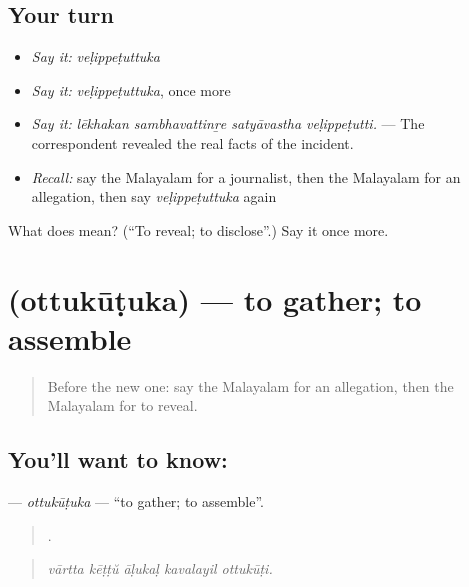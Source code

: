 \subsection*{Your turn}
\begin{itemize}
\raggedright
  \item \emph{Say it:} \emph{veḷippeṭuttuka}
  \item \emph{Say it:} \emph{veḷippeṭuttuka}, once more
  \item \emph{Say it:} \emph{lēkhakan sambhavattinṟe satyāvastha veḷippeṭutti.} — The correspondent revealed the real facts of the incident.
  \item \emph{Recall:} say the Malayalam for a journalist, then the Malayalam for an allegation, then say \emph{veḷippeṭuttuka} again
\end{itemize}

\begin{tcolorbox}[breakable,colback=teal!4,colframe=teal!35!black,title={Before you move on}]
What does  mean? (\textquotedblleft{}To reveal; to disclose\textquotedblright{}.) Say it once more.
\end{tcolorbox}
\section[\texorpdfstring{\ml{ഒത്തുകൂടുക} (ottukūṭuka)}{ഒത്തുകൂടുക (ottukūṭuka)}]{ (ottukūṭuka) — to gather; to assemble}

\label{lesson:ML-C355-ottukutuka}



\begin{quote}
Before the new one: say the Malayalam for an allegation, then the Malayalam for to reveal.
\end{quote}

\subsection*{You'll want to know: }
\textbf{} — \emph{ottukūṭuka} — \textquotedblleft{}to gather; to assemble\textquotedblright{}.

\begin{quote}
    .
\end{quote}

\begin{quote}
\emph{vārtta kēṭṭŭ āḷukaḷ kavalayil ottukūṭi.}
\end{quote}

